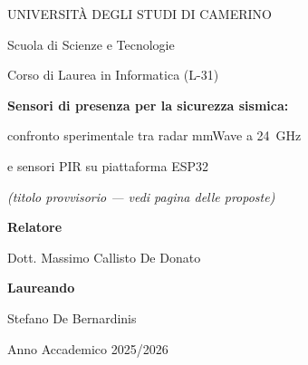 \begin{titlepage}
\centering
\thispagestyle{empty}

{\large UNIVERSIT\`A DEGLI STUDI DI CAMERINO\par}
\vspace{4pt}
{\large Scuola di Scienze e Tecnologie\par}
\vspace{2pt}
{\normalsize Corso di Laurea in Informatica (L-31)\par}

\vspace{1.2cm}
\vspace{1.2cm}

{\Large\bfseries
Sensori di presenza per la sicurezza sismica:\par
confronto sperimentale tra radar mmWave a 24~GHz\par
e sensori PIR su piattaforma ESP32\par}

\vspace{0.4cm}
{\small\itshape (titolo provvisorio --- vedi pagina delle proposte)\par}

\vspace{2.2cm}

\begin{minipage}[t]{0.46\textwidth}
\raggedright
\textbf{Relatore}

\vspace{2pt}
Dott. Massimo Callisto De Donato
\end{minipage}%
\hfill
\begin{minipage}[t]{0.46\textwidth}
\raggedleft
\textbf{Laureando}

\vspace{2pt}
Stefano De Bernardinis
\end{minipage}

\vfill
{\normalsize Anno Accademico 2025/2026\par}
\end{titlepage}
\cleardoublepage
